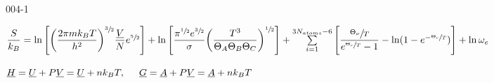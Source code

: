 \begin{mitframe}{004-1}
\begin{listone}
    \item $\dfrac{\entropy}{\boltz}=\ln\Bigg[\bigg(\dfrac{2\pie\mass\boltz\Temp}{\planck^{2}}\bigg)^{\sfrac{3}{2}}\dfrac{\uline{\vol}}{\nummoles}e^{\sfrac{5}{2}}\Bigg]+\ln\Bigg[\dfrac{\pie^{\sfrac{1}{2}}e^{\sfrac{3}{2}}}{\molecrad}\bigg(\dfrac{\Temp^{3}}{\dimltemp_{A}\dimltemp_{B}\dimltemp_{C}}\bigg)^{\sfrac{1}{2}}\Bigg]+\sum\limits_{i=1}^{3\nummoles_{atoms}-6}\Bigg[\dfrac{\sfrac{\vibrfreqfac}{\Temp}}{e^{\sfrac{\vibrfreqfac}{\Temp}}-1}-\ln(1-e^{-\sfrac{\vibrfreqfac}{\Temp}})\Bigg]+\ln\elecdegen$          

    \item $\uline{\enthalpy}=\uline{\intenergy}+\p\uline{\vol}=\uline{\intenergy}+n\boltz\Temp,\tab \uline{\gibbs}=\uline{\helmholtz}+\p\uline{\vol}=\uline{\helmholtz}+n\boltz\Temp$
    
    
    
\end{listone}			

\end{mitframe}